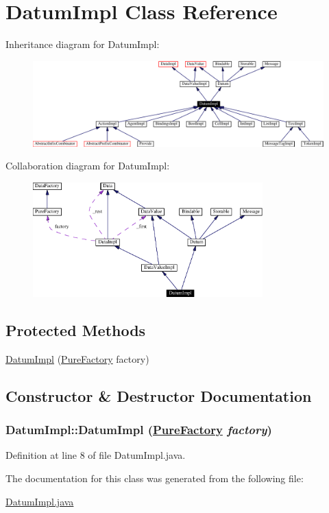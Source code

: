 \hypertarget{classDatumImpl}{
\section{Datum\-Impl  Class Reference}
\label{classDatumImpl}
}
Inheritance diagram for Datum\-Impl:\begin{figure}[H]
\begin{center}
\leavevmode
\includegraphics[width=381pt]{classDatumImpl__inherit__graph}
\end{center}
\end{figure}
Collaboration diagram for Datum\-Impl:\begin{figure}[H]
\begin{center}
\leavevmode
\includegraphics[width=251pt]{classDatumImpl__coll__graph}
\end{center}
\end{figure}
\subsection*{Protected Methods}
\begin{CompactItemize}
\item 
\hyperlink{classDatumImpl_b0}{Datum\-Impl} (\hyperlink{classPureFactory}{Pure\-Factory} factory)
\end{CompactItemize}


\subsection{Constructor \& Destructor Documentation}
\hypertarget{classDatumImpl_b0}{
\subsubsection[DatumImpl]{\setlength{\rightskip}{0pt plus 5cm}Datum\-Impl::Datum\-Impl (\hyperlink{classPureFactory}{Pure\-Factory} {\em factory})}}
\label{classDatumImpl_b0}




Definition at line 8 of file Datum\-Impl.java.

The documentation for this class was generated from the following file:\begin{CompactItemize}
\item 
\hyperlink{DatumImpl_8java-source}{Datum\-Impl.java}\end{CompactItemize}
